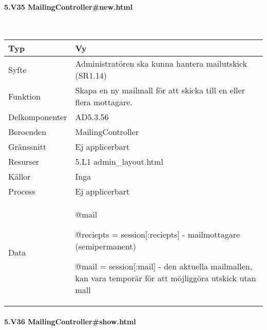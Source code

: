 \documentclass[a4paper, twoside, 11pt, titlepage]{article}
\begin{document}
			\paragraph{5.V35 MailingController\#new.html}\

			\begin {table} [ht] \begin{tabular} {  p{3.5cm} p{9.6cm} }
				\hline
				{Typ} & {Vy} \\
				\hline
				{Syfte} & {Administratören ska kunna hantera mailutskick (SR1.14)} \\
				\hline
				{Funktion} & {Skapa en ny mailmall för att skicka till en eller flera mottagare.} \\
				\hline
				{Delkomponenter} & {AD5.3.56} \\
				\hline
				{Beroenden} & {MailingController} \\
				\hline
				{Gränssnitt} & {Ej applicerbart} \\
				\hline
				{Resurser} & {5.L1 admin\_layout.html} \\
				\hline
				{Källor} & {Inga} \\
				\hline
				{Process} & {Ej applicerbart} \\
				\hline
				{Data} & {@mail

@reciepts = session[:reciepts] - mailmottagare (semipermanent)

@mail = session[:mail] - den aktuella mailmallen, kan vara temporär för att möjliggöra utskick utan mall} \\
				\hline
			\end{tabular} \end{table} \FloatBarrier


			\paragraph{5.V36 MailingController\#show.html}\
\end{document}
